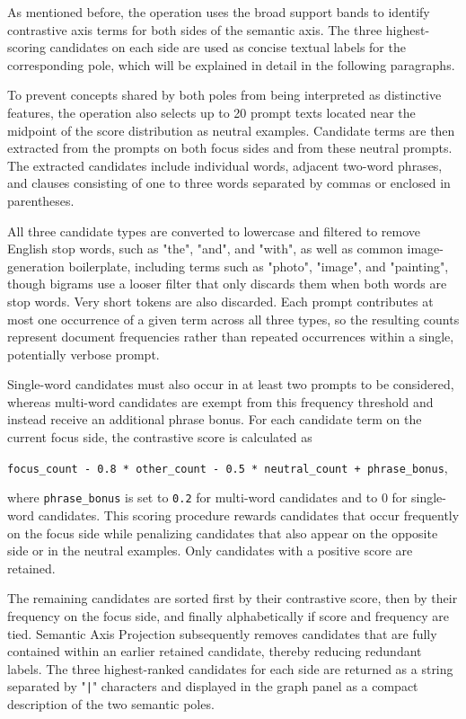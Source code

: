 As mentioned before, the operation uses the broad support bands to identify contrastive axis terms for both sides of the semantic axis. The three highest-scoring candidates on each side are used as concise textual labels for the corresponding pole, which will be explained in detail in the following paragraphs.

To prevent concepts shared by both poles from being interpreted as distinctive features, the operation also selects up to 20 prompt texts located near the midpoint of the score distribution as neutral examples. Candidate terms are then extracted from the prompts on both focus sides and from these neutral prompts. The extracted candidates include individual words, adjacent two-word phrases, and clauses consisting of one to three words separated by commas or enclosed in parentheses.

All three candidate types are converted to lowercase and filtered to remove English stop words, such as "the", "and", and "with", as well as common image-generation boilerplate, including terms such as "photo", "image", and "painting", though bigrams use a looser filter that only discards them when both words are stop words. Very short tokens are also discarded. Each prompt contributes at most one occurrence of a given term across all three types, so the resulting counts represent document frequencies rather than repeated occurrences within a single, potentially verbose prompt.

Single-word candidates must also occur in at least two prompts to be considered, whereas multi-word candidates are exempt from this frequency threshold and instead receive an additional phrase bonus. For each candidate term on the current focus side, the contrastive score is calculated as

\texttt{focus\_count - 0.8 * other\_count - 0.5 * neutral\_count + phrase\_bonus},

where \texttt{phrase\_bonus} is set to \texttt{0.2} for multi-word candidates and to 0 for single-word candidates. This scoring procedure rewards candidates that occur frequently on the focus side while penalizing candidates that also appear on the opposite side or in the neutral examples. Only candidates with a positive score are retained.

The remaining candidates are sorted first by their contrastive score, then by their frequency on the focus side, and finally alphabetically if score and frequency are tied. Semantic Axis Projection subsequently removes candidates that are fully contained within an earlier retained candidate, thereby reducing redundant labels. The three highest-ranked candidates for each side are returned as a string separated by "\texttt{|}" characters and displayed in the graph panel as a compact description of the two semantic poles.

